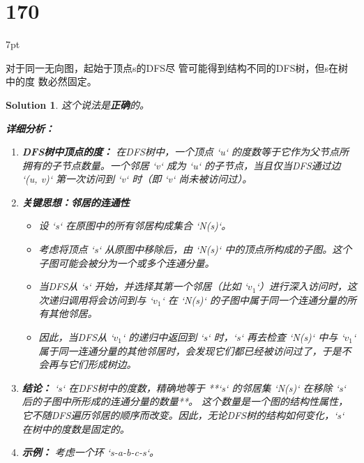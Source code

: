 \documentclass[UTF8]{report}
\newtheorem{solution}{Solution}
\theoremstyle{MyLineTheoremStyle} %
\theoremstyle{MyBlockTheoremStyle} %
\theoremstyle{MySubsubsectionStyle} %
\newenvironment{graybox}{%
        \def\FrameCommand{%
        \hspace{1pt}%
        {\color{gray}\small \vrule width 2pt}%
        {\color{graybox_color}\vrule width 4pt}%
        \colorbox{graybox_color}%
        }%
        \MakeFramed{\advance\hsize-\width\FrameRestore}%
        \noindent\hspace{-4.55pt}%
        \begin{adjustwidth}{}{7pt}%
        \vspace{2pt}\vspace{2pt}%
        }
        {%
        \vspace{2pt}\end{adjustwidth}\endMakeFramed%
        }
\begin{document}
\section*{170}
\begin{graybox}
对于同一无向图，起始于顶点s的DFS尽
管可能得到结构不同的DFS树，但s在树中的度
数必然固定。
\end{graybox}

\begin{solution}
这个说法是\textbf{正确}的。

\textbf{详细分析：}

\begin{enumerate}
    \item \textbf{DFS树中顶点的度：}
    在DFS树中，一个顶点 `u` 的度数等于它作为父节点所拥有的子节点数量。一个邻居 `v` 成为 `u` 的子节点，当且仅当DFS通过边 `(u, v)` 第一次访问到 `v` 时（即 `v` 尚未被访问过）。

    \item \textbf{关键思想：邻居的连通性}
    \begin{itemize}
        \item 设 `s` 在原图中的所有邻居构成集合 `N(s)`。
        \item 考虑将顶点 `s` 从原图中移除后，由 `N(s)` 中的顶点所构成的子图。这个子图可能会被分为一个或多个连通分量。
        \item 当DFS从 `s` 开始，并选择其第一个邻居（比如 `$v_1$`）进行深入访问时，这次递归调用将会访问到与 `$v_1$` 在 `N(s)` 的子图中属于同一个连通分量的所有其他邻居。
        \item 因此，当DFS从 `$v_1$` 的递归中返回到 `s` 时，`s` 再去检查 `N(s)` 中与 `$v_1$` 属于同一连通分量的其他邻居时，会发现它们都已经被访问过了，于是不会再与它们形成树边。
    \end{itemize}

    \item \textbf{结论：}
    `s` 在DFS树中的度数，精确地等于 **`s` 的邻居集 `N(s)` 在移除 `s` 后的子图中所形成的连通分量的数量**。
    这个数量是一个图的结构性属性，它不随DFS遍历邻居的顺序而改变。因此，无论DFS树的结构如何变化，`s` 在树中的度数是固定的。

    \item \textbf{示例：}
    考虑一个环 `s-a-b-c-s`。
    \begin{center}
\end{center}
\end{enumerate}
\end{solution}
\end{document}
